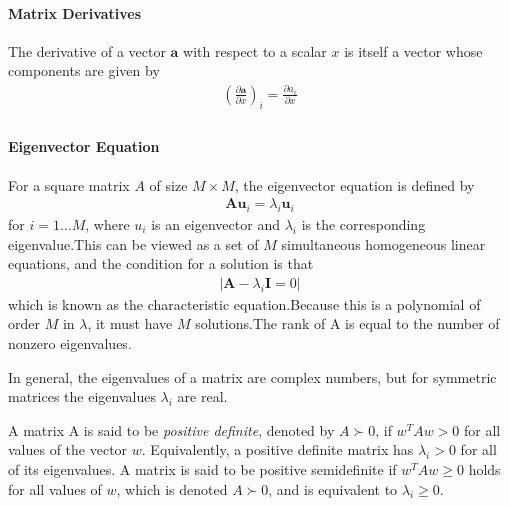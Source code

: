 \documentclass[a4paper]{article}
\begin{document}
\paragraph{Matrix Derivatives}
The derivative of a vector $\mathbf{a}$ with respect to a scalar $x$ is itself a
vector whose components are given by
\begin{align}
(\frac{\partial\mathbf{a}}{\partial x})_i = \frac{\partial
  a_i}{\partial x}\\
\end{align}

\paragraph{Eigenvector Equation}
For a square matrix $A$ of size $M \times M$, the eigenvector equation is defined by
\begin{align}
\mathbf{A}\mathbf{u}_i = \lambda_i\mathbf{u}_i
\end{align}
for $i = 1 \dotsc M$, where $u_i$ is an eigenvector and $\lambda_i$ is
the corresponding eigenvalue.This can be viewed as a set of $M$
simultaneous homogeneous linear equations, and the condition for a solution is that
\begin{align}
|\mathbf{A} - \lambda_i\mathbf{I} = 0|
\end{align}
which is known as the characteristic equation.Because this is a
polynomial of order $M$ in $\lambda$, it must have $M$ solutions.The rank
of A is equal to the number of nonzero eigenvalues.

In general, the eigenvalues of a matrix are complex numbers, but for
symmetric matrices the eigenvalues $\lambda_i$ are real.

A matrix A is said to be \textit{positive deﬁnite}, denoted by $A
\succ 0$, if $w^T Aw > 0$ for all values of the vector
$w$. Equivalently, a positive definite matrix has $\lambda_i > 0$ for
all of its eigenvalues. A matrix is said to be positive semidefinite
if $w^TAw \geq 0$ holds for all values of $w$, which is denoted $A \succ 0$, and is equivalent to $\lambda_i \geq 0$.
\end{document}
